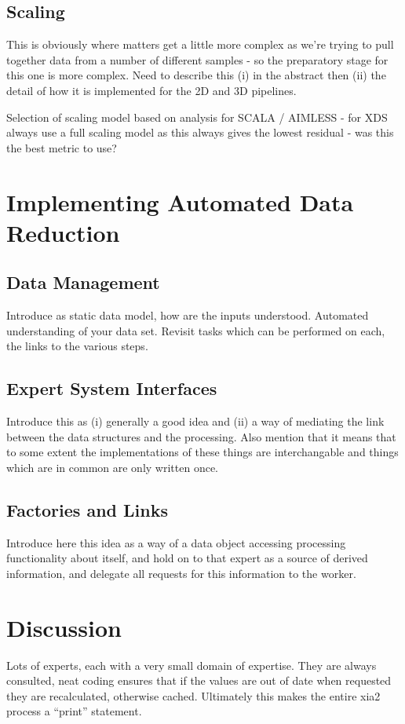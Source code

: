 \documentclass[a4paper,11pt]{article}
\begin{document}
\subsection{Scaling}

This is obviously where matters get a little more complex as we're
trying to pull together data from a number of different samples - so
the preparatory stage for this one is more complex. Need to describe
this (i) in the abstract then (ii) the detail of how it is implemented
for the 2D and 3D pipelines.

Selection of scaling model based on analysis for SCALA / AIMLESS - for
XDS always use a full scaling model as this always gives the lowest
residual - was this the best metric to use?

\section{Implementing Automated Data Reduction}

\subsection{Data Management}

Introduce as static data model, how are the inputs
understood. Automated understanding of your data set. Revisit tasks
which can be performed on each, the links to the various steps.

\subsection{Expert System Interfaces}

Introduce this as (i) generally a good idea and (ii) a way of
mediating the link between the data structures and the
processing. Also mention that it means that to some extent the
implementations of these things are interchangable and things which
are in common are only written once.

\subsection{Factories and Links}

Introduce here this idea as a way of a data object accessing
processing functionality about itself, and hold on to that expert as a
source of derived information, and delegate all requests for this
information to the worker.

\section{Discussion}

Lots of experts, each with a very small domain of expertise. They are
always consulted, neat coding ensures that if the values are out of
date when requested they are recalculated, otherwise
cached. Ultimately this makes the entire xia2 process a ``print''
statement.
\end{document}
